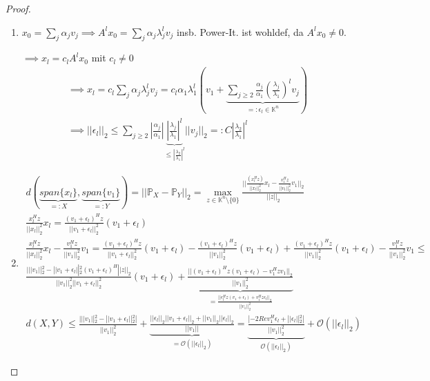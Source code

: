 \begin{proof}
	\begin{enumerate}
		\item $x_0 = \sum_j \alpha_j v_j \implies A^l x_0 = \sum_j \alpha_j \lambda_j^l v_j$ insb. Power-It. ist wohldef, da $A^lx_0 \neq 0$.
		
		$\implies x_l = c_lA^lx_0$ mit $c_l\neq 0$
		\begin{align*}
			\implies x_l = c_l \sum_{j} \alpha_j \lambda_j^l v_j = c_l \alpha_1 \lambda_1^l \left(v_1 + \underbrace{\sum_{j\geq 2} \frac{\alpha_j}{\alpha_1} \left(\frac{\lambda_j}{\lambda_1}\right)^l v_j}_{=: \epsilon_l \in \mathbb{K}^n}\right)\\
			\implies ||\epsilon_l||_2 \leq \sum_{j\geq 2} \left|\frac{\alpha_j}{\alpha_1}\right| \underbrace{\left|\frac{\lambda_j}{\lambda_1}\right|^l}_{\leq \left|\frac{\lambda_2}{\lambda_1}\right|^l} ||v_j||_2 =: C \left|\frac{\lambda_2}{\lambda_1}\right|^l
		\end{align*}
		
		\item
		\begin{align*}
			d(\underbrace{span\{x_l\}}_{=:X}, \underbrace{span\{v_1\}}_{=:Y}) = ||\mathbb{P}_X - \mathbb{P}_Y||_2 = \max_{z \in \mathbb{K}^n\setminus\{0\}} \frac{||\frac{(x_l^Hz)}{||x_l||_2^2}x_l - \frac{v_1^Hz}{||v_1||_2^2}v_1||_2}{||z||_2}\\
			\frac{x_l^Hz}{||x_l||_2^2}x_l = \frac{(v_1 + \epsilon_l)^Hz}{||v_1 + \epsilon_l||_2^2}(v_1 + \epsilon_l)\\
			\frac{x_l^Hz}{||x_l||_2^2}x_l - \frac{v_1^Hz}{||v_1||_2^2}v_1 =
			\frac{(v_1 + \epsilon_l)^Hz}{||v_1 + \epsilon_l||_2^2}(v_1 + \epsilon_l) - \frac{(v_1 + \epsilon_l)^Hz}{||v_1||_2^2}(v_1 + \epsilon_l) + \frac{(v_1 + \epsilon_l)^Hz}{||v_1||_2^2}(v_1 + \epsilon_l) - \frac{v_1^Hz}{||v_1||_2^2}v_1 \leq\\
			\frac{| ||v_1||_2^2 - ||v_1 + \epsilon_l||_2^2 (v_1 + \epsilon_l)^H ||z||_2}{||v_1||_2^2 ||v_1 + \epsilon_l||_2^2}(v_1 + \epsilon_l) + \underbrace{\frac{||(v_1 + \epsilon_l)^Hz(v_1 + \epsilon_l) - v_1^Hz v_1||_2}{||v_1||_2^2}}_{=\frac{||\epsilon_l^Hz(v_1+\epsilon_l) + v_1^Hz\epsilon_l||_2}{||v_1||_2^2}}\\
			d(X,Y) \leq \frac{| ||v_1||_2^2 - ||v_1 + \epsilon_l||_2^2 |}{||v_1||_2^2} + \underbrace{\frac{||\epsilon_l||_2 ||v_1 + \epsilon_l||_2 + ||v_1||_2 ||\epsilon_l||_2}{||v_1||}}_{=\mathcal{O}(||\epsilon_l||_2)} =
			\underbrace{\frac{|-2Rev_1^H\epsilon_l + ||\epsilon_l||_2^2|}{||v_1||_2^2}}_{\mathcal{O}(||\epsilon_l||_2)} + \mathcal{O}(||\epsilon_l||_2)
		\end{align*}
		

\end{enumerate}
\end{proof}
